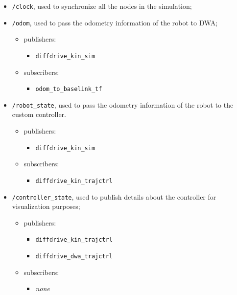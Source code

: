 \documentclass[11pt,a4paper]{article}
\begin{document}
\begin{itemize}

    \item \texttt{/clock}, used to synchronize all the nodes in the simulation;

    \item \texttt{/odom}, used to pass the odometry information of the robot to DWA;
        \begin{itemize}
            \item publishers:
                \begin{itemize}
                    \item \texttt{diffdrive\_kin\_sim}
                \end{itemize}
            \item subscribers:
                \begin{itemize}
                    \item \texttt{odom\_to\_baselink\_tf}
                \end{itemize}
        \end{itemize}

    \item \texttt{/robot\_state}, used to pass the odometry information of the robot to the custom controller.
        \begin{itemize}
            \item publishers:
                \begin{itemize}
                    \item \texttt{diffdrive\_kin\_sim}
                \end{itemize}
            \item subscribers:
                \begin{itemize}
                    \item \texttt{diffdrive\_kin\_trajctrl}
                \end{itemize}
        \end{itemize}

    \item \texttt{/controller\_state}, used to publish details about the controller for visualization purposes;
        \begin{itemize}
            \item publishers:
                \begin{itemize}
                    \item \texttt{diffdrive\_kin\_trajctrl}
                    \item \texttt{diffdrive\_dwa\_trajctrl}
                \end{itemize}
            \item subscribers:
                \begin{itemize}
                    \item \textit{none}
                \end{itemize}
        \end{itemize}


\end{itemize}
\end{document}
